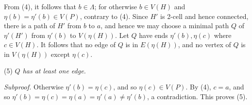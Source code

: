 From (4), it follows that $b \in \Lambda$; for otherwise $b \in V(H)$ and $\eta(b) = \eta'(b) \in V(P)$, contrary to (4). Since $H'$ is 2-cell and hence connected, there is a path of $H'$ from $b$ to $a$, and hence we may choose a minimal path $Q$ of $\eta'(H')$ from $\eta'(b)$ to $V(\eta(H))$. Let $Q$ have ends $\eta'(b), \eta(c)$ where $c \in V(H)$. It follows that no edge of $Q$ is in $E(\eta(H))$, and no vertex of $Q$ is in $V(\eta(H))$ except $\eta(c)$.

\hspace*{12pt}(5) \textit{$Q$ has at least one edge.}

\textit{Subproof.} Otherwise $\eta'(b) = \eta(c)$, and so $\eta(c) \in V(P)$. By (4), $c = a$, and so $\eta'(b) = \eta(c) = \eta(a) = \eta'(a) \ne \eta'(b)$, a contradiction. This proves (5).
